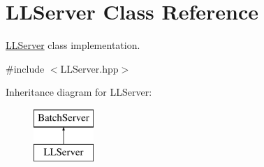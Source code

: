 \hypertarget{classLLServer}{
\section{LLServer Class Reference}
\label{classLLServer}
}


\hyperlink{classLLServer}{LLServer} class implementation.  




{\ttfamily \#include $<$LLServer.hpp$>$}

Inheritance diagram for LLServer:\begin{figure}[H]
\begin{center}
\leavevmode
\includegraphics[height=2.000000cm]{classLLServer}
\end{center}
\end{figure}
